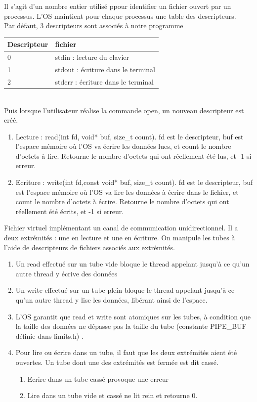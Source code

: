  Il s'agit d'un nombre entier utilisé ppour identifier un fichier ouvert par un processus. L'OS maintient pour chaque processus une table des descripteurs. \\
Par défaut, 3 descripteurs sont associés à notre programme\\
\begin{tabular}{l|l}
Descripteur & fichier \\ \hline
0 & stdin : lecture du clavier \\ \hline
1 & stdout : écriture dans le terminal \\ \hline
2 & stderr : écriture dans le terminal \\ \hline
\end{tabular} \\
Puis lorsque l'utilisateur réalise la commande open, un nouveau descripteur est créé.\\

\begin{enumerate}
	\item Lecture : read(int fd, void* buf, size\_t count). fd est le descripteur, buf est l'espace mémoire où l'OS va écrire les données lues, et count le nombre d'octets à lire. Retourne le nombre d'octets qui ont réellement été lus, et -1 si erreur.
	\item Ecriture : write(int fd,const void* buf, size\_t count). fd est le descripteur, buf est l'espace mémoire où l'OS va lire les données à écrire dans le fichier, et count le nombre d'octets à écrire. Retourne le nombre d'octets qui ont réellement été écrits, et -1 si erreur.
\end{enumerate}

 Fichier virtuel implémentant un canal de communication unidirectionnel. Il a deux extrémités : une en lecture et une en écriture. On manipule les tubes à l'aide de descripteurs de fichiers associés aux extrémités.\\

\begin{enumerate}
	\item Un read effectué sur un tube vide bloque le thread appelant jusqu'à ce qu'un autre thread y écrive des données
	\item Un write effectué sur un tube plein bloque le thread appelant jusqu'à ce qu'un autre thread y lise les données, libérant ainsi de l'espace. 
	\item L'OS garantit que read et write sont atomiques sur les tubes, à condition que la taille des données ne dépasse pas la taille du tube (constante PIPE\_BUF définie dans limits.h) . 
	\item Pour lire ou écrire dans un tube, il faut que les deux extrémités aient été ouvertes. Un tube dont une des extrémités est fermée est dit cassé. 
	\begin{enumerate}
		\item Ecrire dans un tube cassé provoque une erreur
		\item Lire dans un tube vide et cassé ne lit rein et retourne 0.
	\end{enumerate}
\end{enumerate}

